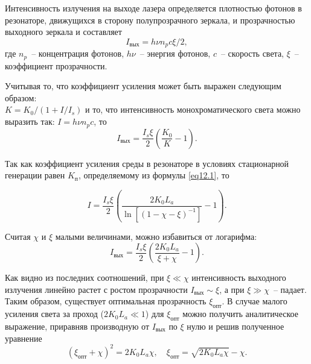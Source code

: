 
Интенсивность излучения на выходе лазера определяется плотностью фотонов в
резонаторе, движущихся в сторону полупрозрачного зеркала, и прозрачностью
выходного зеркала и составляет
\[
  I_\text{вых} = h\nu n_p c\xi / 2,
\]
где \( n_p \)~-- концентрация фотонов, \( h\nu \)~-- энергия фотонов,
\( c \)~-- скорость света, \( \xi \)~-- коэффициент прозрачности.

Учитывая то, что коэффициент усиления может быть выражен следующим образом:\\
\( K = K_0 / (1 + I / I_s) \) и то, что интенсивность монохроматического света
можно выразить так: \( I = h\nu n_p c \), то
\[
  I_\text{вых} = \frac{I_s \xi}{2} \left( \frac{K_0}{K} - 1 \right).
\]

Так как коэффициент усиления среды в резонаторе в условиях стационарной
генерации равен \( K_\text{п} \), определяемому из формулы \eqref{eq12.1}, то

\begin{equation}
  I = \frac{I_s \xi}{2} \left( \frac{2K_0 L_a}{\ln\left[ (1 - \chi - \xi)^{-1}
    \right]} - 1\right).
  \label{eq_1.91}
\end{equation}

Считая \( \chi \) и \( \xi \) малыми величинами, можно избавиться от логарифма:
\[
  I_\text{вых} = \frac{I_s \xi}{2} \left( \frac{2K_0 L_a}{\xi + \chi} - 1
    \right).
\]

Как видно из последних соотношений, при \( \xi \ll \chi \) интенсивность
выходного излучения линейно растет с ростом прозрачности
\( I_\text{вых} \sim \xi \), а при \( \xi \gg \chi \)~-- падает. Таким образом,
существует оптимальная прозрачность \( \xi_\text{опт} \). В случае малого
усиления света за проход (\( 2K_0 L_a \ll 1 \)) для \( \xi_\text{опт} \) можно
получить аналитическое выражение, приравняв производную от \( I_\text{вых} \) по
\( \xi \) нулю и решив полученное уравнение
\[
    (\xi_\text{опт} + \chi)^2 = 2K_0 L_a\chi, \quad
    \xi_\text{опт} = \sqrt{2K_0 L_a\chi} - \chi.
\]
